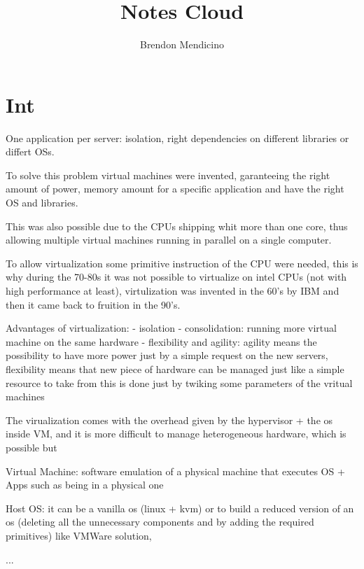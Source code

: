 \documentclass[12pt]{article}
\title{Notes Cloud}
\author{Brendon Mendicino}
\begin{document}
\maketitle
\newpage
\tableofcontents

\section{Int}
One application per server: isolation, right dependencies on different libraries or differt OSs.

To solve this problem virtual machines were invented, garanteeing the right amount of power, memory amount for a specific application and have the right OS and libraries.

This was also possible due to the CPUs shipping whit more than one core, thus allowing multiple virtual machines running in parallel on a single computer.

To allow virtualization some primitive instruction of the CPU were needed, this is why during the 70-80s it was not possible to virtualize on intel CPUs (not with high performance at least), virtulization was invented in the 60's by IBM and then it came back to fruition in the 90's.

Advantages of virtualization:
- isolation
- consolidation: running more virtual machine on the same hardware
- flexibility and agility: agility means the possibility to have more power just by a simple request on the new servers, flexibility means that new piece of hardware can be managed just like a simple resource to take from this is done just by twiking some parameters of the vritual machines

The virualization comes with the overhead given by the hypervisor + the os inside VM, and it is more difficult to manage heterogeneous hardware, which is possible but 

\begin{definition}
  Virtual Machine: software emulation of a physical machine that executes OS + Apps such as being in a physical one

  Host OS: it can be a vanilla os (linux + kvm) or to build a reduced version of an os (deleting all the unnecessary components and by adding the required primitives) like VMWare solution, 
\end{definition}

...
\end{document}
